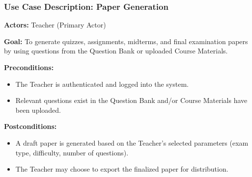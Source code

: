 \documentclass[12pt]{article}
\begin{document}
	\begin{center}
	\end{center}
	
	
	\subsubsection*{Use Case Description: Paper Generation}
	
	\textbf{Actors:} Teacher (Primary Actor)
	
	\textbf{Goal:} To generate quizzes, assignments, midterms, and final examination papers by using questions from the Question Bank or uploaded Course Materials.
	
	\textbf{Preconditions:}
	\begin{itemize}
		\item The Teacher is authenticated and logged into the system.
		\item Relevant questions exist in the Question Bank and/or Course Materials have been uploaded.
	\end{itemize}
	
	\textbf{Postconditions:}
	\begin{itemize}
		\item A draft paper is generated based on the Teacher’s selected parameters (exam type, difficulty, number of questions).
		\item The Teacher may choose to export the finalized paper for distribution.
	\end{itemize}
	
\end{document}

